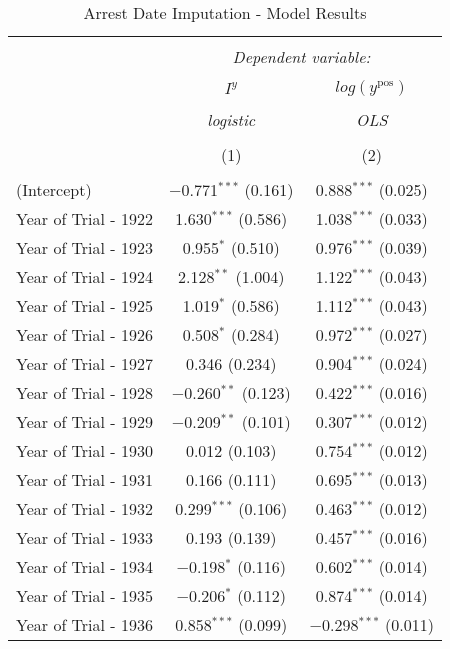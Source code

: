 
\begin{table}[!h] \centering 
  \caption{Arrest Date Imputation - Model Results} 
  \label{tab:date_imp_results} 
\small 
\begin{tabular}{@{\extracolsep{5pt}}lcc} 
\\[-1.8ex]\hline 
\hline \\[-1.8ex] 
 & \multicolumn{2}{c}{\textit{Dependent variable:}} \\ 
\cline{2-3} 
\\[-1.8ex] & $I^y$ & $log(y^{\text{pos}})$ \\ 
\\[-1.8ex] & \textit{logistic} & \textit{OLS} \\ 
\\[-1.8ex] & (1) & (2)\\ 
\hline \\[-1.8ex] 
 (Intercept) & $-$0.771$^{***}$ (0.161) & 0.888$^{***}$ (0.025) \\ 
  Year of Trial - 1922 & 1.630$^{***}$ (0.586) & 1.038$^{***}$ (0.033) \\ 
  Year of Trial - 1923 & 0.955$^{*}$ (0.510) & 0.976$^{***}$ (0.039) \\ 
  Year of Trial - 1924 & 2.128$^{**}$ (1.004) & 1.122$^{***}$ (0.043) \\ 
  Year of Trial - 1925 & 1.019$^{*}$ (0.586) & 1.112$^{***}$ (0.043) \\ 
  Year of Trial - 1926 & 0.508$^{*}$ (0.284) & 0.972$^{***}$ (0.027) \\ 
  Year of Trial - 1927 & 0.346 (0.234) & 0.904$^{***}$ (0.024) \\ 
  Year of Trial - 1928 & $-$0.260$^{**}$ (0.123) & 0.422$^{***}$ (0.016) \\ 
  Year of Trial - 1929 & $-$0.209$^{**}$ (0.101) & 0.307$^{***}$ (0.012) \\ 
  Year of Trial - 1930 & 0.012 (0.103) & 0.754$^{***}$ (0.012) \\ 
  Year of Trial - 1931 & 0.166 (0.111) & 0.695$^{***}$ (0.013) \\ 
  Year of Trial - 1932 & 0.299$^{***}$ (0.106) & 0.463$^{***}$ (0.012) \\ 
  Year of Trial - 1933 & 0.193 (0.139) & 0.457$^{***}$ (0.016) \\ 
  Year of Trial - 1934 & $-$0.198$^{*}$ (0.116) & 0.602$^{***}$ (0.014) \\ 
  Year of Trial - 1935 & $-$0.206$^{*}$ (0.112) & 0.874$^{***}$ (0.014) \\ 
  Year of Trial - 1936 & 0.858$^{***}$ (0.099) & $-$0.298$^{***}$ (0.011) \\ 

\end{tabular}
\end{table}
